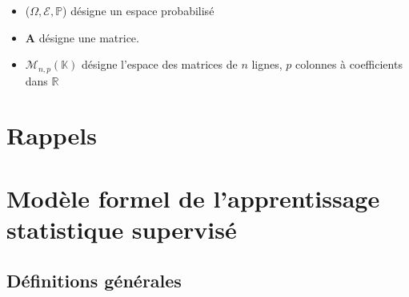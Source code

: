 \begin{itemize}
    \begin{equation}
        (ERM)_{\mathcal{H}}(S) = A(S) = h_S = \text{arg} \min_{h \in \mathcal{H}} \mathcal{R}_S(h) \nonumber
    \end{equation}
    C'est la meilleure hypothèse pour le \textit{dataset} $S$. \newline 
    \item ($\Omega, \mathcal{E}, \mathbb{P}$) désigne un espace probabilisé \newline
    \item $\mathbf{A}$ désigne une matrice. \newline
    \item $\mathcal{M}_{n,p}(\mathbb{K})$ désigne l'espace des matrices de $n$ lignes, $p$ colonnes à coefficients dans $\mathbb{R}$
\end{itemize}

\chapter*{Rappels}

\noindent

\chapter{Modèle formel de l'apprentissage statistique supervisé}
\section{Définitions générales}


